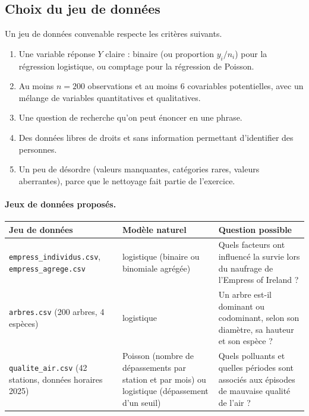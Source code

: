 \documentclass[11pt,letterpaper]{scrartcl}
\begin{document}
\subsection{Choix du jeu de données}

Un jeu de données convenable respecte les critères suivants.
\begin{enumerate}
  \item Une variable réponse $Y$ claire : binaire (ou proportion $y_i/n_i$) pour la régression logistique, ou comptage pour la régression de Poisson.
  \item Au moins $n = 200$ observations et au moins 6 covariables potentielles, avec un mélange de variables quantitatives et qualitatives.
  \item Une question de recherche qu'on peut énoncer en une phrase.
  \item Des données libres de droits et sans information permettant d'identifier des personnes.
  \item Un peu de désordre (valeurs manquantes, catégories rares, valeurs aberrantes), parce que le nettoyage fait partie de l'exercice.
\end{enumerate}

\paragraph{Jeux de données proposés.}

\begin{center}
\small
\begin{tabular}{@{}>{\raggedright\arraybackslash}p{4.3cm}>{\raggedright\arraybackslash}p{3.7cm}>{\raggedright\arraybackslash}p{6.3cm}@{}}
\toprule
Jeu de données & Modèle naturel & Question possible \\
\midrule
\texttt{empress\_individus.csv}, \texttt{empress\_agrege.csv} & logistique (binaire ou binomiale agrégée) & Quels facteurs ont influencé la survie lors du naufrage de l'Empress of Ireland ? \\
\texttt{arbres.csv} (200 arbres, 4 espèces) & logistique & Un arbre est-il dominant ou codominant, selon son diamètre, sa hauteur et son espèce ? \\
\texttt{qualite\_air.csv} (42 stations, données horaires 2025) & Poisson (nombre de dépassements par station et par mois) ou logistique (dépassement d'un seuil) & Quels polluants et quelles périodes sont associés aux épisodes de mauvaise qualité de l'air ? \\
\bottomrule
\end{tabular}
\end{center}
\end{document}
